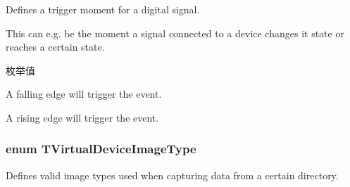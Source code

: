 Defines a trigger moment for a digital signal. 

This can e.\+g. be the moment a signal connected to a device changes it state or reaches a certain state. \begin{Desc}
\item[枚举值]\par
\begin{description}
\item[{\em 
\hypertarget{group___device_specific_interface_ggaecea4d916e389bf03470e46d3c8e1851afaade990c4ca085ad0ae5a0a088c3022}{tm\+On\+Falling\+Edge}\label{group___device_specific_interface_ggaecea4d916e389bf03470e46d3c8e1851afaade990c4ca085ad0ae5a0a088c3022}
}]A falling edge will trigger the event. \item[{\em 
\hypertarget{group___device_specific_interface_ggaecea4d916e389bf03470e46d3c8e1851a921f55d85f3eb5d59a8eec53da585606}{tm\+On\+Rising\+Edge}\label{group___device_specific_interface_ggaecea4d916e389bf03470e46d3c8e1851a921f55d85f3eb5d59a8eec53da585606}
}]A rising edge will trigger the event. \end{description}
\end{Desc}
\hypertarget{group___device_specific_interface_ga5b29826e8e9b1e0b25124f77ac6ff6e5}{
\subsubsection[{T\+Virtual\+Device\+Image\+Type}]{\setlength{\rightskip}{0pt plus 5cm}enum {\bf T\+Virtual\+Device\+Image\+Type}}}\label{group___device_specific_interface_ga5b29826e8e9b1e0b25124f77ac6ff6e5}


Defines valid image types used when capturing data from a certain directory. 

